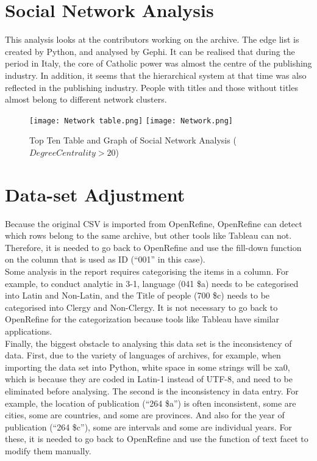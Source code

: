 \documentclass[11pt]{article}
\begin{document}
\section{Social Network Analysis}
\label{SocialNetworkAnalysis}
This analysis looks at the contributors working on the archive. The edge list is created by Python, and analysed by Gephi. It can be realised that during the period in Italy, the core of Catholic power was almost the centre of the publishing industry. In addition, it seems that the hierarchical system at that time was also reflected in the publishing industry. People with titles and those without titles almost belong to different network clusters.
\begin{figure}[H]
\centering
\texttt{[image: Network table.png]}
\texttt{[image: Network.png]}
\caption{Top Ten Table and Graph of Social Network Analysis ($Degree Centrality > 20$)}
\label{fig:plutchik}
\end{figure}

\section{Data-set Adjustment}
\label{DataSetAdjustment}
Because the original CSV is imported from OpenRefine, OpenRefine can detect which rows belong to the same archive, but other tools like Tableau can not. Therefore, it is needed to go back to OpenRefine and use the fill-down function on the column that is used as ID (“001” in this case).
\\
Some analysis in the report requires categorising the items in a column. For example, to conduct analytic in 3-1, language (041 \$a) needs to be categorised into Latin and Non-Latin, and the Title of people (700 \$c) needs to be categorised into Clergy and Non-Clergy. It is not necessary to go back to OpenRefine for the categorization because tools like Tableau have similar applications.
\\
Finally, the biggest obstacle to analysing this data set is the inconsistency of data. First, due to the variety of languages of archives, for example, when importing the data set into Python, white space in some strings will be \/xa0, which is because they are coded in Latin-1 instead of UTF-8, and need to be eliminated before analysing. The second is the inconsistency in data entry. For example, the location of publication (“264 \$a”) is often inconsistent, some are cities, some are countries, and some are provinces. And also for the year of publication (“264 \$c”), some are intervals and some are individual years. For these, it is needed to go back to OpenRefine and use the function of text facet to modify them manually.
\end{document}
